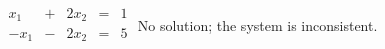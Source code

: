 {$\begin{array}{KQJQQ}
x_1&+&2x_2&=&1\\
-x_1&-&2x_2&=&5\\
\end{array}$}
{No solution; the system is inconsistent.}
